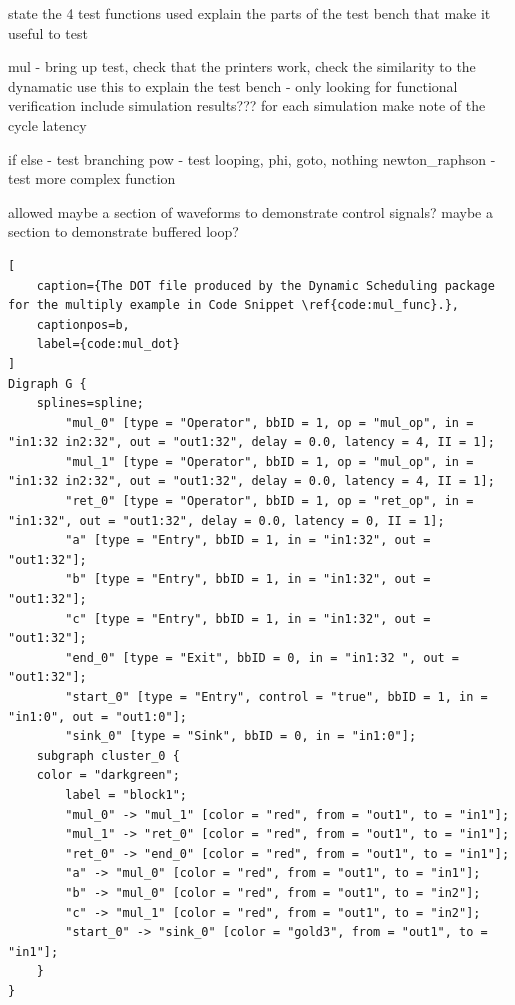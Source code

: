 state the 4 test functions used
explain the parts of the test bench that make it useful to test

mul - bring up test, check that the printers work, check the similarity to the dynamatic
use this to explain the test bench - only looking for functional verification
include simulation results??? 
for each simulation make note of the cycle latency

if else - test branching 
pow - test looping, phi, goto, nothing
newton_raphson - test more complex function

allowed maybe a section of waveforms to demonstrate control signals?
maybe a section to demonstrate buffered loop?







\begin{lstlisting}[
    caption={The DOT file produced by the Dynamic Scheduling package for the multiply example in Code Snippet \ref{code:mul_func}.},
    captionpos=b, 
    label={code:mul_dot}
]
Digraph G {
	splines=spline;
		"mul_0" [type = "Operator", bbID = 1, op = "mul_op", in = "in1:32 in2:32", out = "out1:32", delay = 0.0, latency = 4, II = 1];
		"mul_1" [type = "Operator", bbID = 1, op = "mul_op", in = "in1:32 in2:32", out = "out1:32", delay = 0.0, latency = 4, II = 1];
		"ret_0" [type = "Operator", bbID = 1, op = "ret_op", in = "in1:32", out = "out1:32", delay = 0.0, latency = 0, II = 1];
		"a" [type = "Entry", bbID = 1, in = "in1:32", out = "out1:32"];
		"b" [type = "Entry", bbID = 1, in = "in1:32", out = "out1:32"];
		"c" [type = "Entry", bbID = 1, in = "in1:32", out = "out1:32"];
		"end_0" [type = "Exit", bbID = 0, in = "in1:32 ", out = "out1:32"];
		"start_0" [type = "Entry", control = "true", bbID = 1, in = "in1:0", out = "out1:0"];
		"sink_0" [type = "Sink", bbID = 0, in = "in1:0"];
	subgraph cluster_0 {
	color = "darkgreen";
		label = "block1";
		"mul_0" -> "mul_1" [color = "red", from = "out1", to = "in1"];
		"mul_1" -> "ret_0" [color = "red", from = "out1", to = "in1"];
		"ret_0" -> "end_0" [color = "red", from = "out1", to = "in1"];
		"a" -> "mul_0" [color = "red", from = "out1", to = "in1"];
		"b" -> "mul_0" [color = "red", from = "out1", to = "in2"];
		"c" -> "mul_1" [color = "red", from = "out1", to = "in2"];
		"start_0" -> "sink_0" [color = "gold3", from = "out1", to = "in1"];
	}
}
\end{lstlisting}
\fi